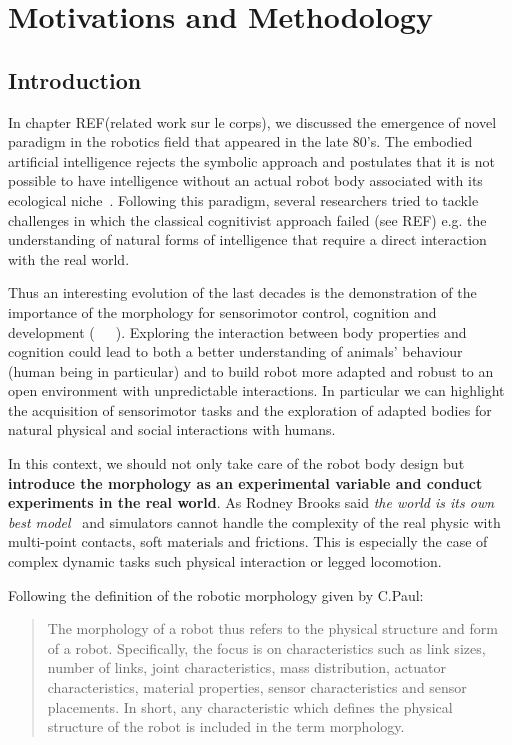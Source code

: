 
\chapter{Motivations and Methodology}


\section{Introduction} %

In chapter REF(related work sur le corps), we discussed the emergence of novel paradigm in the robotics field that appeared in the late 80's. The embodied artificial intelligence rejects the symbolic approach and postulates that it is not possible to have intelligence without an actual robot body associated with its ecological niche~\cite{pfeifer2001understanding}. Following this paradigm, several researchers tried to tackle challenges in which the classical cognitivist approach failed (see REF) e.g. the understanding of natural forms of intelligence that require a direct interaction with the real world.

Thus an interesting evolution of the last decades is the demonstration of the importance of the morphology for sensorimotor control, cognition and development (~\cite{REF}~\cite{REF}~\cite{REF}). Exploring the interaction between body properties and cognition could lead to both a better understanding of animals’ behaviour (human being in particular) and to build robot more adapted and robust to an open environment with unpredictable interactions. In particular we can highlight the acquisition of sensorimotor tasks and the exploration of adapted bodies for natural physical and social interactions with humans.

In this context, we should not only take care of the robot body design but \textbf{introduce the morphology as an experimental variable and conduct experiments in the real world}. As Rodney Brooks said \emph{the world is its own best model}~\cite{brooks1991intelligence} and simulators cannot handle the complexity of the real physic with multi-point contacts, soft materials and frictions. This is especially the case of complex dynamic tasks such physical interaction or legged locomotion.


Following the definition of the robotic morphology given by C.Paul:
\begin{quotation}
    The morphology of a robot thus refers to the physical structure and form of a robot. Specifically, the focus is on characteristics such as link sizes, number of links, joint characteristics, mass distribution, actuator characteristics, material properties, sensor characteristics and sensor placements. In short, any characteristic which defines the physical structure of the robot is included in the term morphology.
\end{quotation}

